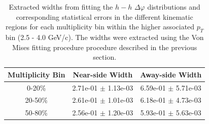 \documentclass[ALICE,manyauthors]{ALICE_analysis_notes}
\begin{document}
\begin{table}[h!]
\centering
\begin{tabular}{| c || c | c | }
\hline
Multiplicity Bin & Near-side Width & Away-side Width \\
\hline
0-20\% & 2.71e-01 $\pm$ 1.13e-03 &  6.59e-01 $\pm$ 5.71e-03 \\
20-50\% & 2.61e-01 $\pm$ 1.01e-03 &  6.18e-01 $\pm$ 4.73e-03 \\
50-80\% & 2.56e-01 $\pm$ 1.20e-03 &  5.93e-01 $\pm$ 5.63e-03 \\
\hline
\end{tabular}
\caption{Extracted widths from fitting the $h-h$ $\Delta\varphi$ distributions and corresponding statistical errors in the different kinematic regions for each multiplicity bin within the higher associated $p_{T}$ bin (2.5 - 4.0 GeV/c). The widths were extracted using the Von Mises fitting procedure procedure described in the previous section.}
\label{h_h_width_table_highpt}
\end{table}
\end{document}
